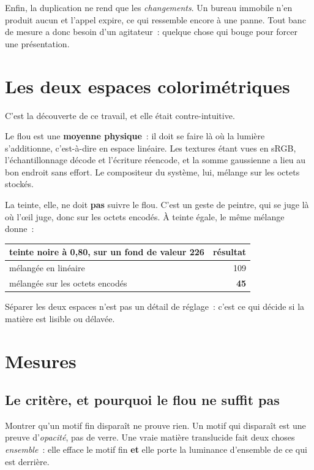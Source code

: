 \documentclass[11pt,a4paper]{article}
\newcommand{\np}[1]{#1}
\begin{document}
\medskip
Enfin, la duplication ne rend que les \emph{changements}. Un bureau immobile
n'en produit aucun et l'appel expire, ce qui ressemble encore à une panne. Tout
banc de mesure a donc besoin d'un agitateur~: quelque chose qui bouge pour
forcer une présentation.

\section{Les deux espaces colorimétriques}
\label{sec:espaces}

C'est la découverte de ce travail, et elle était contre-intuitive.

Le flou est une \textbf{moyenne physique}~: il doit se faire là où la lumière
s'additionne, c'est-à-dire en espace linéaire. Les textures étant vues en
sRGB, l'échantillonnage décode et l'écriture réencode, et la somme gaussienne
a lieu au bon endroit sans effort. Le compositeur du système, lui, mélange sur
les octets stockés.

La teinte, elle, ne doit \textbf{pas} suivre le flou. C'est un geste de
peintre, qui se juge là où l'\oe il juge, donc sur les octets encodés. À
teinte égale, le même mélange donne~:

\begin{center}
\begin{tabular}{lr}
\toprule
teinte noire à \np{0,80}, sur un fond de valeur 226 & résultat \\
\midrule
mélangée en linéaire & 109 \\
mélangée sur les octets encodés & \textbf{45} \\
\bottomrule
\end{tabular}
\end{center}

Séparer les deux espaces n'est pas un détail de réglage~: c'est ce qui décide
si la matière est lisible ou délavée.

\section{Mesures}

\subsection{Le critère, et pourquoi le flou ne suffit pas}

Montrer qu'un motif fin disparaît ne prouve rien. Un motif qui disparaît est
une preuve d'\emph{opacité}, pas de verre. Une vraie matière translucide fait
deux choses \emph{ensemble}~: elle efface le motif fin \textbf{et} elle porte
la luminance d'ensemble de ce qui est derrière.
\end{document}
